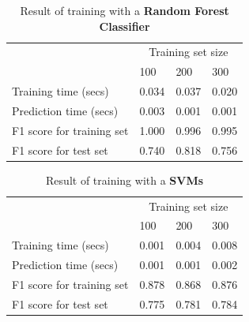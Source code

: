 \documentclass[12pt]{article}
\begin{document}
\setlength{\extrarowheight}{1.5pt}
\begin{table}[!htbp]
\caption{Result of training with a \textbf{Random Forest Classifier}} %
\centering %
\begin{tabular}{|p{6cm}|p{1.5cm}|p{1.5cm}|p{1.5cm}|} %
\hline %
& \multicolumn{3}{c|}{Training set size}\\[5pt]
\cline{2-4} 
& 100 & 200 & 300\\[0.5ex]
\hline %

Training time (secs)          &  0.034&  0.037&  0.020\\ 
Prediction time (secs)        &  0.003&  0.001&  0.001\\ 
F1 score for training set     &  1.000&  0.996&  0.995\\ 
F1 score for test set         &  0.740&  0.818&  0.756\\ 
\hline %
\end{tabular}
\label{randomForestClassifierTable}
\end{table}


\setlength{\extrarowheight}{1.5pt}
\begin{table}[!htbp]
\caption{Result of training with a \textbf{SVMs}} %
\centering %
\begin{tabular}{|p{6cm}|p{1.5cm}|p{1.5cm}|p{1.5cm}|} %
\hline %
& \multicolumn{3}{c|}{Training set size}\\[5pt]
\cline{2-4} 
& 100 & 200 & 300\\[0.5ex]
\hline %

Training time (secs)          &  0.001&  0.004&  0.008\\ 
Prediction time (secs)        &  0.001&  0.001&  0.002\\ 
F1 score for training set     &  0.878&  0.868&  0.876\\ 
F1 score for test set         &  0.775&  0.781&  0.784\\
\hline %
\end{tabular}
\label{svmTable}
\end{table}
\end{document}

